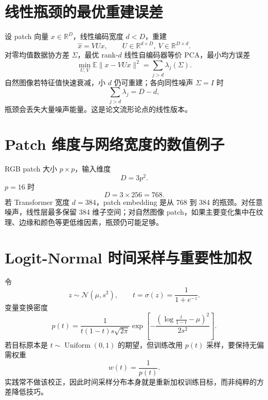\documentclass[UTF8,12pt,a4paper,fontset=none]{ctexart}
\numberwithin{equation}{section}
\newcommand{\R}{\mathbb{R}}
\newcommand{\E}{\mathbb{E}}
\begin{document}
\section{线性瓶颈的最优重建误差}
设 patch 向量 $x\in\R^D$，线性编码宽度 $d<D$，重建
\begin{equation}
 \widehat x=VUx,
 \qquad U\in\R^{d\times D},\ V\in\R^{D\times d}.
\end{equation}
对零均值数据协方差 $\Sigma$，最优 rank-$d$ 线性自编码器等价 PCA，最小均方误差
\begin{equation}
 \min_{U,V}\E\|x-VUx\|^2
 =\sum_{j>d}\lambda_j(\Sigma).
\end{equation}
自然图像若特征值快速衰减，小 $d$ 仍可重建；各向同性噪声 $\Sigma=I$ 时
\begin{equation}
 \sum_{j>d}\lambda_j=D-d,
\end{equation}
瓶颈会丢失大量噪声能量。这是论文流形论点的线性版本。

\section{Patch 维度与网络宽度的数值例子}
RGB patch 大小 $p\times p$，输入维度
\begin{equation}
 D=3p^2.
\end{equation}
$p=16$ 时
\begin{equation}
 D=3\times256=768.
\end{equation}
若 Transformer 宽度 $d=384$，patch embedding 是从 768 到 384 的瓶颈。对任意噪声，线性层最多保留 384 维子空间；对自然图像 patch，如果主要变化集中在纹理、边缘和颜色等更低维因素，瓶颈仍可能足够。

\section{Logit-Normal 时间采样与重要性加权}
令
\begin{equation}
 z\sim\mathcal N(\mu,s^2),
 \qquad t=\sigma(z)=\frac1{1+e^{-z}}.
\end{equation}
变量变换密度
\begin{equation}
 p(t)=\frac1{t(1-t)s\sqrt{2\pi}}
 \exp\left[-\frac{(\log\frac{t}{1-t}-\mu)^2}{2s^2}\right].
\end{equation}
若目标原本是 $t\sim\operatorname{Uniform}(0,1)$ 的期望，但训练改用 $p(t)$ 采样，要保持无偏需权重
\begin{equation}
 w(t)=\frac1{p(t)}.
\end{equation}
实践常不做该校正，因此时间采样分布本身就是重新加权训练目标，而非纯粹的方差降低技巧。
\end{document}
